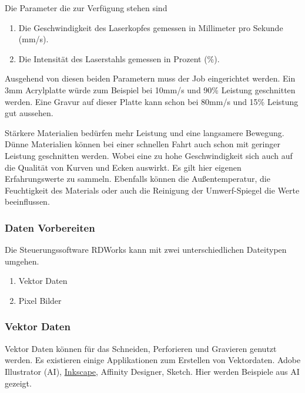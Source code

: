 \documentclass[]{article}
\providecommand{\tightlist}{%
  \setlength{\itemsep}{0pt}\setlength{\parskip}{0pt}}
\begin{document}
Die Parameter die zur Verfügung stehen sind

\begin{enumerate}
\def\labelenumi{\arabic{enumi}.}
\tightlist
\item
  Die Geschwindigkeit des Laserkopfes gemessen in Millimeter pro Sekunde
  (mm/s).
\item
  Die Intensität des Laserstahls gemessen in Prozent (\%).
\end{enumerate}

Ausgehend von diesen beiden Parametern muss der Job eingerichtet werden.
Ein 3mm Acrylplatte würde zum Beispiel bei 10mm/s und 90\% Leistung
geschnitten werden. Eine Gravur auf dieser Platte kann schon bei 80mm/s
und 15\% Leistung gut aussehen.

Stärkere Materialien bedürfen mehr Leistung und eine langsamere
Bewegung. Dünne Materialien können bei einer schnellen Fahrt auch schon
mit geringer Leistung geschnitten werden. Wobei eine zu hohe
Geschwindigkeit sich auch auf die Qualität von Kurven und Ecken
auswirkt. Es gilt hier eigenen Erfahrungswerte zu sammeln. Ebenfalls
können die Außentemperatur, die Feuchtigkeit des Materials oder auch die
Reinigung der Umwerf-Spiegel die Werte beeinflussen.

\hypertarget{daten-vorbereiten}{%
\subsubsection{Daten Vorbereiten}\label{daten-vorbereiten}}

Die Steuerungssoftware RDWorks kann mit zwei unterschiedlichen
Dateitypen umgehen.

\begin{enumerate}
\def\labelenumi{\arabic{enumi}.}
\tightlist
\item
  Vektor Daten
\item
  Pixel Bilder
\end{enumerate}

\hypertarget{vektor-daten}{%
\subsubsection{Vektor Daten}\label{vektor-daten}}

Vektor Daten können für das Schneiden, Perforieren und Gravieren genutzt
werden. Es existieren einige Applikationen zum Erstellen von
Vektordaten. Adobe Illustrator (AI),
\href{https://inkscape.org/en/}{Inkscape}, Affinity Designer, Sketch.
Hier werden Beispiele aus AI gezeigt.
\end{document}

